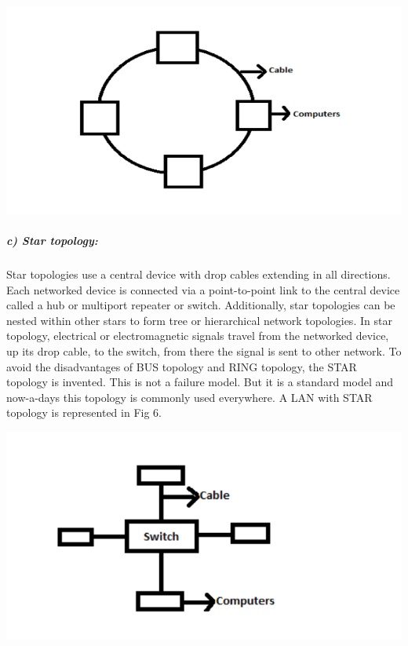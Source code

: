 \documentclass[12pt]{article}
\newenvironment{Figure}
  {\par\medskip\noindent\minipage{\linewidth}}
  {\endminipage\par\medskip}
\begin{document}
\begin{multicols*}{2}
\begin{Figure}
 \centering
 \includegraphics[width=\linewidth]{ring.png}
\end{Figure}

\subparagraph{c) Star topology:}
\indent Star topologies use a central device with drop
cables extending in all directions. Each networked
device is connected via a point-to-point link to the
central device called a hub or multiport repeater or
switch. Additionally, star topologies can be nested
within other stars to form tree or hierarchical network
topologies. In star topology, electrical or
electromagnetic signals travel from the networked
device, up its drop cable, to the switch, from there the
signal is sent to other network. To avoid the
disadvantages of BUS topology and RING topology,
the STAR topology is invented. This is not a failure
model. But it is a standard model and now-a-days this
topology is commonly used everywhere. A LAN with
STAR topology is represented in Fig 6.

\begin{Figure}
 \centering
 \includegraphics[width=\linewidth]{star.png}
\end{Figure}


\end{multicols*}
\end{document}

